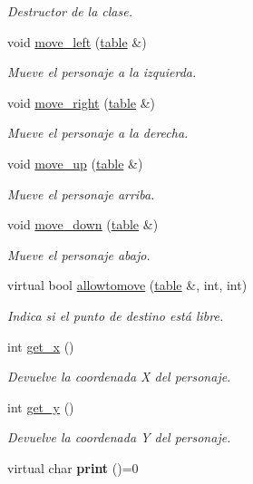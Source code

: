 \begin{DoxyCompactItemize}
\begin{DoxyCompactList}\small\item\em Destructor de la clase. \end{DoxyCompactList}\item 
void \hyperlink{classcharacter_a31acbdba24d42ab44099c55e65f62c26}{move\-\_\-left} (\hyperlink{classtable}{table} \&)
\begin{DoxyCompactList}\small\item\em Mueve el personaje a la izquierda. \end{DoxyCompactList}\item 
void \hyperlink{classcharacter_a966d6f2730b82a43d606c0ae4588d8cc}{move\-\_\-right} (\hyperlink{classtable}{table} \&)
\begin{DoxyCompactList}\small\item\em Mueve el personaje a la derecha. \end{DoxyCompactList}\item 
void \hyperlink{classcharacter_a23f839d31e42c3452a0088f5a14fdeff}{move\-\_\-up} (\hyperlink{classtable}{table} \&)
\begin{DoxyCompactList}\small\item\em Mueve el personaje arriba. \end{DoxyCompactList}\item 
void \hyperlink{classcharacter_a416c6bcfeb6fdc5539ec95edca399673}{move\-\_\-down} (\hyperlink{classtable}{table} \&)
\begin{DoxyCompactList}\small\item\em Mueve el personaje abajo. \end{DoxyCompactList}\item 
virtual bool \hyperlink{classcharacter_af3afd992370f845b5af942ef6bb72fe3}{allowtomove} (\hyperlink{classtable}{table} \&, int, int)
\begin{DoxyCompactList}\small\item\em Indica si el punto de destino está libre. \end{DoxyCompactList}\item 
int \hyperlink{classcharacter_af85ff3cf6f818757278122f9c18e15b1}{get\-\_\-x} ()
\begin{DoxyCompactList}\small\item\em Devuelve la coordenada X del personaje. \end{DoxyCompactList}\item 
int \hyperlink{classcharacter_a68926e58b8bbf238476b02d52685cb99}{get\-\_\-y} ()
\begin{DoxyCompactList}\small\item\em Devuelve la coordenada Y del personaje. \end{DoxyCompactList}\item 
\hypertarget{classcharacter_a1b1b651826ffdb357429c80225dc39c8}{virtual char {\bfseries print} ()=0}\label{classcharacter_a1b1b651826ffdb357429c80225dc39c8}


\end{DoxyCompactItemize}
